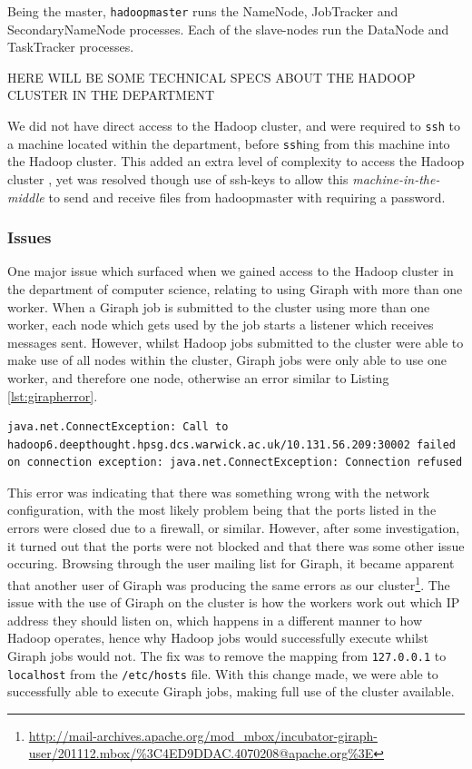 Being the master, {\tt hadoopmaster} runs the NameNode, JobTracker and SecondaryNameNode processes. Each of the slave-nodes run the DataNode and TaskTracker processes.

HERE WILL BE SOME TECHNICAL SPECS ABOUT THE HADOOP CLUSTER IN THE DEPARTMENT

We did not have direct access to the Hadoop cluster, and were required to {\tt ssh} to a machine located within the department, before {\tt ssh}ing from this machine into the Hadoop cluster. This added an extra level of complexity to access the Hadoop cluster , yet was resolved though use of ssh-keys to allow this \emph{machine-in-the-middle} to send and receive files from hadoopmaster with requiring a password.

\subsubsection{Issues}
One major issue which surfaced when we gained access to the Hadoop cluster in the department of computer science, relating to using Giraph with more than one worker. When a Giraph job is submitted to the cluster using more than one worker, each node which gets used by the job starts a listener which receives messages sent. However, whilst Hadoop jobs submitted to the cluster were able to make use of all nodes within the cluster, Giraph jobs were only able to use one worker, and therefore one node, otherwise an error similar to Listing \ref{lst:girapherror}.

\begin{lstlisting}[float]
java.net.ConnectException: Call to hadoop6.deepthought.hpsg.dcs.warwick.ac.uk/10.131.56.209:30002 failed on connection exception: java.net.ConnectException: Connection refused
\end{lstlisting}

This error was indicating that there was something wrong with the network configuration, with the most likely problem being that the ports listed in the errors were closed due to a firewall, or similar. However, after some investigation, it turned out that the ports were not blocked and that there was some other issue occuring. Browsing through the user mailing list for Giraph, it became apparent that another user of Giraph was producing the same errors as our cluster\footnote{\url{http://mail-archives.apache.org/mod_mbox/incubator-giraph-user/201112.mbox/\%3C4ED9DDAC.4070208@apache.org\%3E}}. The issue with the use of Giraph on the cluster is how the workers work out which IP address they should listen on, which happens in a different manner to how Hadoop operates, hence why Hadoop jobs would successfully execute whilst Giraph jobs would not. The fix was to remove the mapping from {\tt 127.0.0.1} to {\tt localhost} from the {\tt /etc/hosts} file. With this change made, we were able to successfully able to execute Giraph jobs, making full use of the cluster available.

